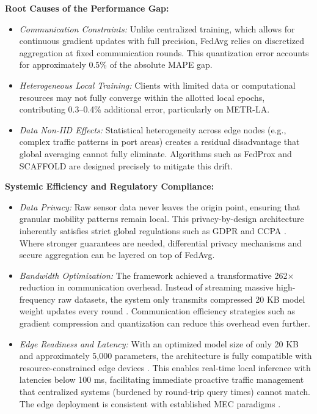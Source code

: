 \documentclass[pdflatex,sn-mathphys-num]{sn-jnl}
\theoremstyle{thmstyleone}
\theoremstyle{thmstyletwo}
\theoremstyle{thmstylethree}
\begin{document}
\textbf{Root Causes of the Performance Gap:}
\begin{itemize}
    \item \textit{Communication Constraints:} Unlike centralized training, which allows for continuous gradient updates with full precision, FedAvg \cite{mcmahan2017fedavg} relies on discretized aggregation at fixed communication rounds. This quantization error accounts for approximately 0.5\% of the absolute MAPE gap.
    \item \textit{Heterogeneous Local Training:} Clients with limited data or computational resources may not fully converge within the allotted local epochs, contributing 0.3--0.4\% additional error, particularly on METR-LA.
    \item \textit{Data Non-IID Effects:} Statistical heterogeneity across edge nodes \cite{Zhao2018FederatedNonIID} (e.g., complex traffic patterns in port areas) creates a residual disadvantage that global averaging cannot fully eliminate. Algorithms such as FedProx \cite{li2020fedprox} and SCAFFOLD \cite{karimireddy2020scaffold} are designed precisely to mitigate this drift.
\end{itemize}

\textbf{Systemic Efficiency and Regulatory Compliance:}
\begin{itemize}
    \item \textit{Data Privacy:} Raw sensor data never leaves the origin point, ensuring that granular mobility patterns remain local. This privacy-by-design architecture inherently satisfies strict global regulations such as GDPR \cite{gdpr2016} and CCPA \cite{tariq2024trustworthy}. Where stronger guarantees are needed, differential privacy mechanisms \cite{dwork2014differential} and secure aggregation \cite{bonawitz2017secagg} can be layered on top of FedAvg.
    \item \textit{Bandwidth Optimization:} The framework achieved a transformative 262$\times$ reduction in communication overhead. Instead of streaming massive high-frequency raw datasets, the system only transmits compressed 20 KB model weight updates every round \cite{mcmahan2017fedavg}. Communication efficiency strategies \cite{konecny2016federated} such as gradient compression and quantization can reduce this overhead even further.
    \item \textit{Edge Readiness and Latency:} With an optimized model size of only 20 KB and approximately 5,000 parameters, the architecture is fully compatible with resource-constrained edge devices \cite{dai2025short,bharati2022federated}. This enables real-time local inference with latencies below 100 ms, facilitating immediate proactive traffic management that centralized systems (burdened by round-trip query times) cannot match. The edge deployment is consistent with established MEC paradigms \cite{shi2016edge,mach2017mobile}.
\end{itemize}
\end{document}
